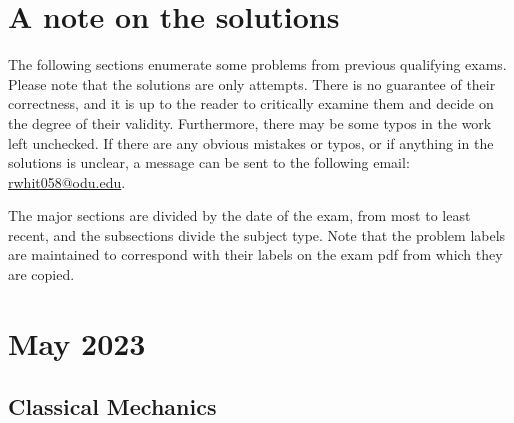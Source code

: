 




\tableofcontents

\newpage

\section*{A note on the solutions}

The following sections enumerate some problems from previous qualifying exams.
Please note that the solutions are only attempts.
There is no guarantee of their correctness, and it is up to the reader to critically examine them and decide on the degree of their validity.
Furthermore, there may be some typos in the work left unchecked.
If there are any obvious mistakes or typos, or if anything in the solutions is unclear, a message can be sent to the following email: \href{mailto:rwhit058@odu.edu}{rwhit058@odu.edu}.

The major sections are divided by the date of the exam, from most to least recent, and the subsections divide the subject type.
Note that the problem labels are maintained to correspond with their labels on the exam pdf from which they are copied.

\newpage

\section{May 2023}

\subsection*{Classical Mechanics}


